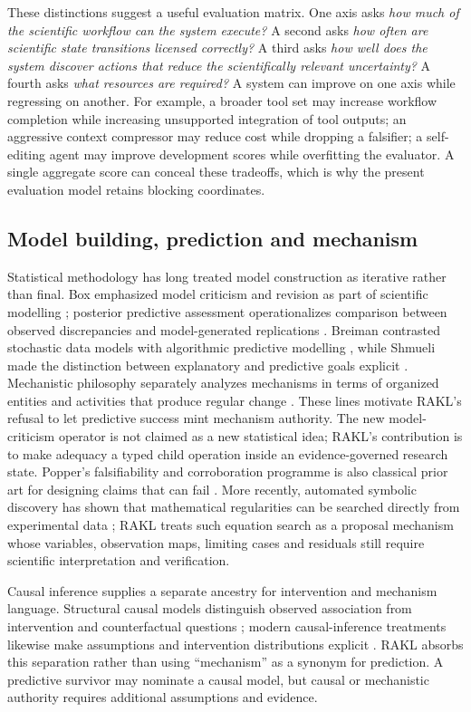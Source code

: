 These distinctions suggest a useful evaluation matrix. One axis asks \emph{how much of the scientific workflow can the system execute?} A second asks \emph{how often are scientific state transitions licensed correctly?} A third asks \emph{how well does the system discover actions that reduce the scientifically relevant uncertainty?} A fourth asks \emph{what resources are required?} A system can improve on one axis while regressing on another. For example, a broader tool set may increase workflow completion while increasing unsupported integration of tool outputs; an aggressive context compressor may reduce cost while dropping a falsifier; a self-editing agent may improve development scores while overfitting the evaluator. A single aggregate score can conceal these tradeoffs, which is why the present evaluation model retains blocking coordinates.

\subsection{Model building, prediction and mechanism}
Statistical methodology has long treated model construction as iterative rather than final. Box emphasized model criticism and revision as part of scientific modelling \cite{box1976}; posterior predictive assessment operationalizes comparison between observed discrepancies and model-generated replications \cite{gelman1996}. Breiman contrasted stochastic data models with algorithmic predictive modelling \cite{breiman2001}, while Shmueli made the distinction between explanatory and predictive goals explicit \cite{shmueli2010}. Mechanistic philosophy separately analyzes mechanisms in terms of organized entities and activities that produce regular change \cite{machamer2000}. These lines motivate RAKL's refusal to let predictive success mint mechanism authority. The new model-criticism operator is not claimed as a new statistical idea; RAKL's contribution is to make adequacy a typed child operation inside an evidence-governed research state. Popper's falsifiability and corroboration programme is also classical prior art for designing claims that can fail \cite{popper1959}. More recently, automated symbolic discovery has shown that mathematical regularities can be searched directly from experimental data \cite{schmidt2009}; RAKL treats such equation search as a proposal mechanism whose variables, observation maps, limiting cases and residuals still require scientific interpretation and verification.

Causal inference supplies a separate ancestry for intervention and mechanism language. Structural causal models distinguish observed association from intervention and counterfactual questions \cite{pearl2009}; modern causal-inference treatments likewise make assumptions and intervention distributions explicit \cite{peters2017}. RAKL absorbs this separation rather than using ``mechanism'' as a synonym for prediction. A predictive survivor may nominate a causal model, but causal or mechanistic authority requires additional assumptions and evidence.

